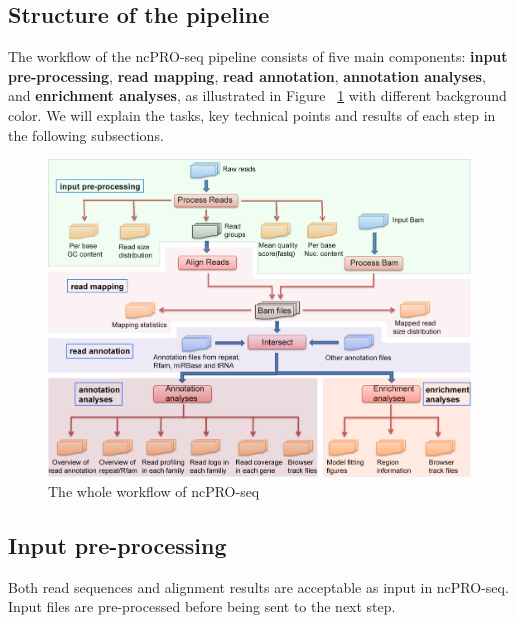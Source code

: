 \documentclass[12pt]{article}
\def \ncpip{ncPRO-seq}
\begin{document}
\subsection{Structure of the pipeline}
The workflow of the \ncpip{} pipeline consists of five main components: \textbf{input pre-processing}, \textbf{read mapping}, \textbf{read annotation}, \textbf{annotation analyses}, and \textbf{enrichment analyses}, as illustrated in Figure ~\ref{fig:pipelinestructure} with different background color. We will explain the tasks, key technical points and results of each step in the following subsections.
\begin{figure}[!h]
\includegraphics[width=160mm]{pipeline.png}
\caption{The whole workflow of \ncpip{}}
\label{fig:pipelinestructure}
\end{figure} 
\subsection{Input pre-processing}
Both read sequences and alignment results are acceptable as input in \ncpip{}. Input files are pre-processed before being sent to the next step.
\end{document}

